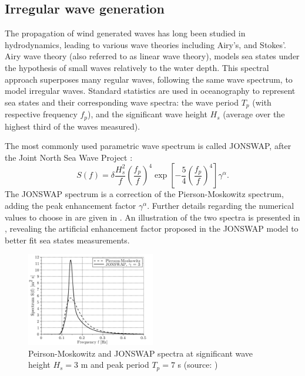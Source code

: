 \subsection{Irregular wave generation}

The propagation of wind generated waves has long been studied in hydrodynamics, leading to various wave theories including Airy's, and Stokes'. 
Airy wave theory (also referred to as linear wave theory), models sea states under the hypothesis of small waves relatively to the water depth.  
This spectral approach superposes many regular waves, following the same wave spectrum, to model irregular waves. 
Standard statistics are used in oceanography to represent sea states and their corresponding wave spectra: 
the wave period $T_p$ (with respective frequency $f_p$), and the significant wave height $H_s$ (average over the highest third of the waves measured). 

The most commonly used parametric wave spectrum is called JONSWAP, after the Joint North Sea Wave Project \citep{jonswap_1973}: 
\begin{equation}
    S(f) = \delta \frac{H_s^2}{f} \left(\frac{f_p}{f}\right)^4 \exp\left[-\frac54 \left(\frac{f_p}{f}\right)^4 \right] \gamma^\alpha.
    \label{eq:jonswap}
\end{equation}
The JONSWAP spectrum is a correction of the Pierson-Moskowitz spectrum, adding the peak enhancement factor $\gamma^\alpha$. 
Further details regarding the numerical values to choose in  are given in \citet{burton_2021_wind_handbook}. 
An illustration of the two spectra is presented in , revealing the artificial enhancement factor proposed in the JONSWAP model to better fit sea states measurements. 



\begin{figure}
    \centering
    \includegraphics[width=0.5\textwidth]{./part1/figures/jonswap.png}
    \caption{Peirson-Moskowitz and JONSWAP spectra at significant wave height $H_s = 3$
    m and peak period $T_p = 7$ s (source: \citet{milano_thesis_2021})}
    \label{fig:jonswap}
\end{figure}




